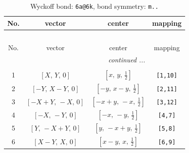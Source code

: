 \documentclass[fleqn,8pt]{jsarticle}
\begin{document}
\begin{longtable}{cccc}
\caption{Wyckoff bond: {\tt 6a@6k}, bond symmetry: {\tt m..}}
 \\
 \hline \hline
No. & vector & center & mapping \\ \hline \endfirsthead

\multicolumn{3}{l}{\tablename\ \thetable{}} \\
 \hline \hline
No. & vector & center & mapping \\ \hline \endhead

 \hline \hline
\multicolumn{3}{r}{\footnotesize\it continued ...} \\ \endfoot

 \hline \hline
\multicolumn{3}{r}{} \\ \endlastfoot

1 & $\left[ X,\, Y,\, 0 \right]$ & $\left[ x,\, y,\, \frac{1}{2} \right]$ & {\tt [1,10]} \\ \hline
2 & $\left[ - Y,\, X - Y,\, 0 \right]$ & $\left[ - y,\, x - y,\, \frac{1}{2} \right]$ & {\tt [2,11]} \\ \hline
3 & $\left[ - X + Y,\, - X,\, 0 \right]$ & $\left[ - x + y,\, - x,\, \frac{1}{2} \right]$ & {\tt [3,12]} \\ \hline
4 & $\left[ - X,\, - Y,\, 0 \right]$ & $\left[ - x,\, - y,\, \frac{1}{2} \right]$ & {\tt [4,7]} \\ \hline
5 & $\left[ Y,\, - X + Y,\, 0 \right]$ & $\left[ y,\, - x + y,\, \frac{1}{2} \right]$ & {\tt [5,8]} \\ \hline
6 & $\left[ X - Y,\, X,\, 0 \right]$ & $\left[ x - y,\, x,\, \frac{1}{2} \right]$ & {\tt [6,9]} \\
\end{longtable}
\renewcommand{\arraystretch}{1.2}
\end{document}
